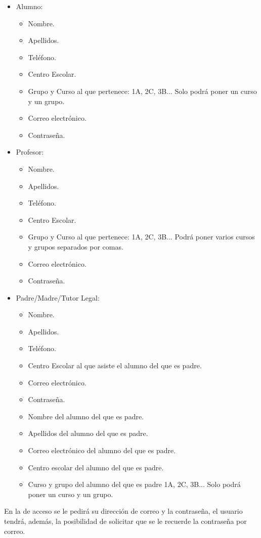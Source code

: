 \begin{itemize}
	\item Alumno:
	\begin{itemize}
		\item Nombre.
		\item Apellidos.
		\item Teléfono.
		\item Centro Escolar.
		\item Grupo y Curso al que pertenece: 1A, 2C, 3B... Solo podrá poner un curso y un grupo.
		\item Correo electrónico.
		\item Contraseña.
	\end{itemize}
	\item Profesor:
	\begin{itemize}
		\item Nombre.
		\item Apellidos.
		\item Teléfono.
		\item Centro Escolar.
		\item Grupo y Curso al que pertenece: 1A, 2C, 3B... Podrá poner varios cursos y grupos separados por comas.
		\item Correo electrónico.
		\item Contraseña.
	\end{itemize}
	\item Padre/Madre/Tutor Legal:
	\begin{itemize}
		\item Nombre.
		\item Apellidos.
		\item Teléfono.
		\item Centro Escolar al que asiste el alumno del que es padre.
		\item Correo electrónico.
		\item Contraseña.
		\item Nombre del alumno del que es padre.
		\item Apellidos del alumno del que es padre.
		\item Correo electrónico del alumno del que es padre.
		\item Centro escolar del alumno del que es padre.
		\item Curso y grupo del alumno del que es padre 1A, 2C, 3B... Solo podrá poner un curso y un grupo.
	\end{itemize}
\end{itemize}
En la de acceso se le pedirá su dirección de correo y la contraseña, el usuario tendrá, además, la posibilidad de solicitar que se le recuerde la contraseña por correo.\\
